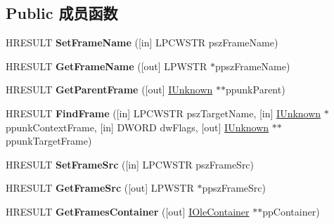 \subsection*{Public 成员函数}
\begin{DoxyCompactItemize}
\item 
\mbox{\label{interface_i_target_frame_a2d56f0c5293cdc09bbc8d0978037fe4a}} 
H\+R\+E\+S\+U\+LT {\bfseries Set\+Frame\+Name} (\mbox{[}in\mbox{]} L\+P\+C\+W\+S\+TR psz\+Frame\+Name)
\item 
\mbox{\label{interface_i_target_frame_aaadec3a2a488e1e2c58e6f2536b85439}} 
H\+R\+E\+S\+U\+LT {\bfseries Get\+Frame\+Name} (\mbox{[}out\mbox{]} L\+P\+W\+S\+TR $\ast$ppsz\+Frame\+Name)
\item 
\mbox{\label{interface_i_target_frame_ab492db3703e21018a1185016980bfb7e}} 
H\+R\+E\+S\+U\+LT {\bfseries Get\+Parent\+Frame} (\mbox{[}out\mbox{]} \hyperlink{interface_i_unknown}{I\+Unknown} $\ast$$\ast$ppunk\+Parent)
\item 
\mbox{\label{interface_i_target_frame_ae2e3491da9c25638875b9a246de41c1c}} 
H\+R\+E\+S\+U\+LT {\bfseries Find\+Frame} (\mbox{[}in\mbox{]} L\+P\+C\+W\+S\+TR psz\+Target\+Name, \mbox{[}in\mbox{]} \hyperlink{interface_i_unknown}{I\+Unknown} $\ast$ppunk\+Context\+Frame, \mbox{[}in\mbox{]} D\+W\+O\+RD dw\+Flags, \mbox{[}out\mbox{]} \hyperlink{interface_i_unknown}{I\+Unknown} $\ast$$\ast$ppunk\+Target\+Frame)
\item 
\mbox{\label{interface_i_target_frame_ad62026ce66a39144faffb87bb0ad6805}} 
H\+R\+E\+S\+U\+LT {\bfseries Set\+Frame\+Src} (\mbox{[}in\mbox{]} L\+P\+C\+W\+S\+TR psz\+Frame\+Src)
\item 
\mbox{\label{interface_i_target_frame_ac0df0870438e29dbc6968750b9683cbd}} 
H\+R\+E\+S\+U\+LT {\bfseries Get\+Frame\+Src} (\mbox{[}out\mbox{]} L\+P\+W\+S\+TR $\ast$ppsz\+Frame\+Src)
\item 
\mbox{\label{interface_i_target_frame_abc95d0051f87910334619882b4e03b6c}} 
H\+R\+E\+S\+U\+LT {\bfseries Get\+Frames\+Container} (\mbox{[}out\mbox{]} \hyperlink{interface_i_ole_container}{I\+Ole\+Container} $\ast$$\ast$pp\+Container)
$$
\end{DoxyCompactItemize}
